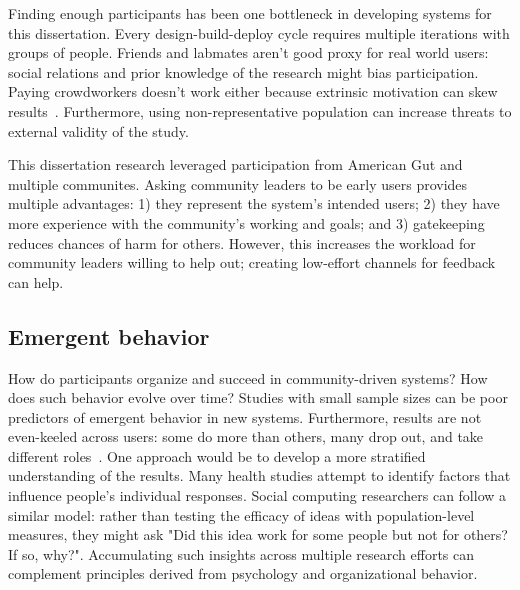 

Finding enough participants has been one bottleneck in developing systems for this dissertation. Every design-build-deploy cycle requires multiple iterations with groups of people. Friends and labmates aren't good proxy for real world users: social relations and prior knowledge of the research might bias participation. Paying crowdworkers doesn't work either because extrinsic motivation can skew results~\cite{Chandler2013}. Furthermore, using non-representative population can increase threats to external validity of the study.

This dissertation research leveraged participation from American Gut and multiple communites. Asking community leaders to be early users provides multiple advantages: 1) they represent the system's intended users; 2) they have more experience with the community's working and goals; and 3) gatekeeping reduces chances of harm for others. However, this increases the workload for community leaders willing to help out; creating low-effort channels for feedback can help.

\subsection{Emergent behavior}
How do participants organize and succeed in community-driven systems? How does such behavior evolve over time? Studies with small sample sizes can be poor predictors of emergent behavior in new systems. Furthermore, results are not even-keeled across users: some do more than others, many drop out, and take different roles~\cite{Bryant2005}. One approach would be to develop a more stratified understanding of the results. Many health studies attempt to identify factors that influence people's individual responses. Social computing researchers can follow a similar model: rather than testing the efficacy of ideas with population-level measures, they might ask "Did this idea work for some people but not for others? If so, why?". Accumulating such insights across multiple research efforts can complement principles derived from psychology and organizational behavior. 

